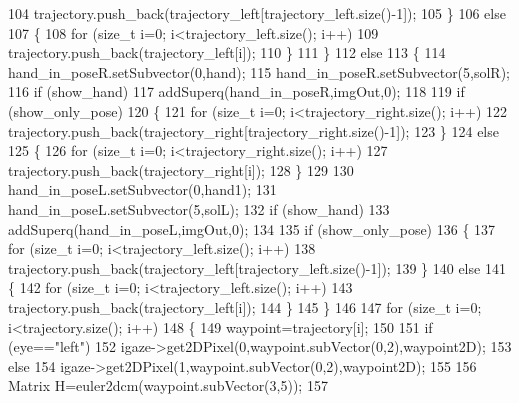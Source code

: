 \begin{DoxyCode}
104                     trajectory.push\_back(trajectory_left[trajectory_left.size()-1]);
105             \}
106             \textcolor{keywordflow}{else}
107             \{
108                 \textcolor{keywordflow}{for} (\textcolor{keywordtype}{size\_t} i=0; i<trajectory_left.size(); i++)
109                     trajectory.push\_back(trajectory_left[i]);
110             \}
111         \}
112         \textcolor{keywordflow}{else}
113         \{
114             hand_in_poseR.setSubvector(0,hand);
115             hand_in_poseR.setSubvector(5,solR);
116             \textcolor{keywordflow}{if} (show_hand)
117                 addSuperq(hand_in_poseR,imgOut,0);
118 
119             \textcolor{keywordflow}{if} (show_only_pose)
120             \{
121                 \textcolor{keywordflow}{for} (\textcolor{keywordtype}{size\_t} i=0; i<trajectory_right.size(); i++)
122                     trajectory.push\_back(trajectory_right[trajectory_right.size()-1]);
123             \}
124             \textcolor{keywordflow}{else}
125             \{
126                 \textcolor{keywordflow}{for} (\textcolor{keywordtype}{size\_t} i=0; i<trajectory_right.size(); i++)
127                     trajectory.push\_back(trajectory_right[i]);
128             \}
129 
130             hand_in_poseL.setSubvector(0,hand1);
131             hand_in_poseL.setSubvector(5,solL);
132             \textcolor{keywordflow}{if} (show_hand)
133                 addSuperq(hand_in_poseL,imgOut,0);
134 
135             \textcolor{keywordflow}{if} (show_only_pose)
136             \{
137                 \textcolor{keywordflow}{for} (\textcolor{keywordtype}{size\_t} i=0; i<trajectory_left.size(); i++)
138                     trajectory.push\_back(trajectory_left[trajectory_left.size()-1]);
139             \}
140             \textcolor{keywordflow}{else}
141             \{
142                 \textcolor{keywordflow}{for} (\textcolor{keywordtype}{size\_t} i=0; i<trajectory_left.size(); i++)
143                     trajectory.push\_back(trajectory_left[i]);
144             \}
145         \}
146 
147         \textcolor{keywordflow}{for} (\textcolor{keywordtype}{size\_t} i=0; i<trajectory.size(); i++)
148         \{
149             waypoint=trajectory[i];
150 
151             \textcolor{keywordflow}{if} (eye==\textcolor{stringliteral}{"left"})
152                 igaze->get2DPixel(0,waypoint.subVector(0,2),waypoint2D);
153             \textcolor{keywordflow}{else}
154                 igaze->get2DPixel(1,waypoint.subVector(0,2),waypoint2D);
155 
156             Matrix H=euler2dcm(waypoint.subVector(3,5));
157 

\end{DoxyCode}
